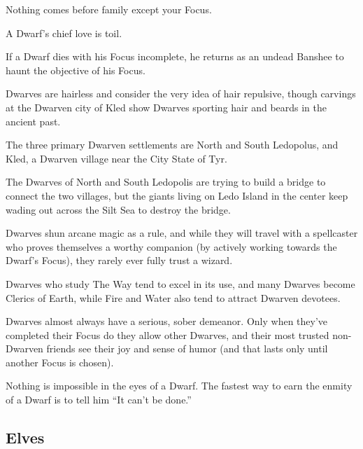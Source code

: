 \begin{multicols}{2}
\begin{description}
    \item Nothing comes before family except your Focus.
    \item A Dwarf’s chief love is toil.
    \item If a Dwarf dies with his Focus incomplete, he returns as an undead Banshee to haunt the objective of his Focus.
    \item Dwarves are hairless and consider the very idea of hair repulsive, though carvings at the Dwarven city of Kled show Dwarves sporting hair and beards in the ancient past.
    \item The three primary Dwarven settlements are North and South Ledopolus, and Kled, a Dwarven village near the City State of Tyr.
    \item The Dwarves of North and South Ledopolis are trying to build a bridge to connect the two villages, but the giants living on Ledo Island in the center keep wading out across the Silt Sea to destroy the bridge.
    \item Dwarves shun arcane magic as a rule, and while they will travel with a spellcaster who proves themselves a worthy companion (by actively working towards the Dwarf’s Focus), they rarely ever fully trust a wizard.
    \item Dwarves who study The Way tend to excel in its use, and many Dwarves become Clerics of Earth, while Fire and Water also tend to attract Dwarven devotees.
    \item Dwarves almost always have a serious, sober demeanor. Only when they’ve completed their Focus do they allow other Dwarves, and their most trusted non-Dwarven friends see their joy and sense of humor (and that lasts only until another Focus is chosen).
    \item Nothing is impossible in the eyes of a Dwarf. The fastest way to earn the enmity of a Dwarf is to tell him “It can’t be done.”
\end{description}

\subsection{Elves}


\end{multicols}
